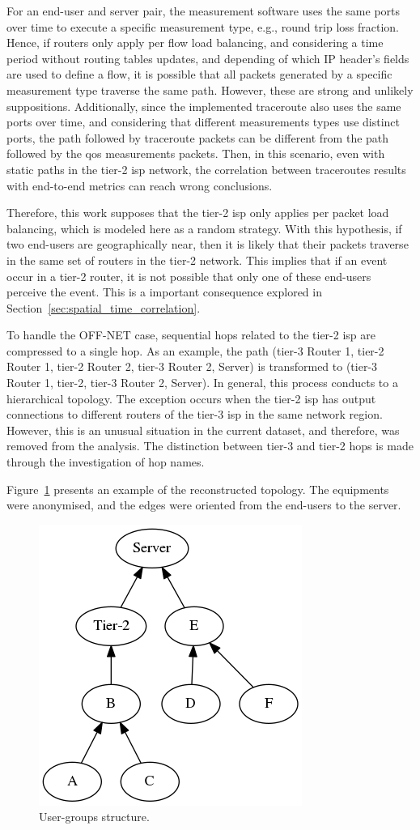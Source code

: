 For an end-user and server pair,
the measurement software uses the same ports over time to execute a specific
measurement type, e.g., round trip loss fraction.
Hence, if routers only apply per flow load balancing,
and considering a time period without routing tables updates, and
depending of which IP header's fields are used to define a flow, it is possible
that all packets generated by a specific measurement type traverse the same
path. However, these are strong and unlikely suppositions.
Additionally, since the implemented traceroute also uses the same ports over
time, and considering that different measurements types use distinct ports,
the
path followed by traceroute packets can be different from the path followed by
the \gls*{qos} measurements packets. Then, in this scenario, even with static paths in
the tier-2 \gls*{isp} network, the correlation between traceroutes
results with end-to-end metrics can reach wrong conclusions.

Therefore, this work supposes that the tier-2 \gls*{isp} only applies per packet load
balancing, which is modeled here as a random strategy. With this hypothesis,
if two end-users are geographically near, then it is likely that their packets
traverse in the same set of routers in the tier-2 network. This implies that if
an event occur in a tier-2 router, it is not possible that only one of these
end-users perceive the event. This is a important consequence explored in
Section~\ref{sec:spatial_time_correlation}.

To handle the OFF-NET case, sequential hops related to
the tier-2 \gls*{isp} are compressed to a single hop.
As an example, the path (tier-3 Router 1, tier-2 Router 1, tier-2 Router 2,
tier-3 Router 2, Server) is
transformed to (tier-3 Router 1, tier-2, tier-3 Router 2, Server).
In general, this process conducts to a hierarchical topology.
The exception occurs when the tier-2 \gls*{isp} has output connections to
different routers of the tier-3 \gls*{isp} in the same network region.
However, this is an unusual situation in
the current dataset, and therefore, was removed from the analysis.
The distinction between
tier-3 and tier-2 hops is made through the investigation of hop names.

Figure~\ref{fig:real_graph} presents an example of the reconstructed
topology. The equipments were anonymised, and the edges were oriented from the
end-users to the server.

\begin{figure}[H]
    \centering
    \includegraphics[width=0.35\linewidth]{./figures/methodology/spatial_correlation/dtstart2016-05-01_dtend2016-05-11_NRIDTCLDM031_graph_anonymized.png}
    \caption{User-groups structure.}
\label{fig:real_graph}
\end{figure}%

